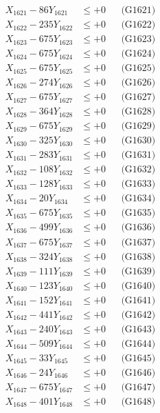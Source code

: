 \documentclass[a4paper,10pt]{article}
\begin{document}
{\begin{align}
\allowbreak
X_{1621} - 86Y_{1621} &\leq +0 && \text{(G1621)} \\
X_{1622} - 235Y_{1622} &\leq +0 && \text{(G1622)} \\
X_{1623} - 675Y_{1623} &\leq +0 && \text{(G1623)} \\
X_{1624} - 675Y_{1624} &\leq +0 && \text{(G1624)} \\
X_{1625} - 675Y_{1625} &\leq +0 && \text{(G1625)} \\
X_{1626} - 274Y_{1626} &\leq +0 && \text{(G1626)} \\
X_{1627} - 675Y_{1627} &\leq +0 && \text{(G1627)} \\
X_{1628} - 364Y_{1628} &\leq +0 && \text{(G1628)} \\
X_{1629} - 675Y_{1629} &\leq +0 && \text{(G1629)} \\
X_{1630} - 325Y_{1630} &\leq +0 && \text{(G1630)} \\
\allowbreak
X_{1631} - 283Y_{1631} &\leq +0 && \text{(G1631)} \\
X_{1632} - 108Y_{1632} &\leq +0 && \text{(G1632)} \\
X_{1633} - 128Y_{1633} &\leq +0 && \text{(G1633)} \\
X_{1634} - 20Y_{1634} &\leq +0 && \text{(G1634)} \\
X_{1635} - 675Y_{1635} &\leq +0 && \text{(G1635)} \\
X_{1636} - 499Y_{1636} &\leq +0 && \text{(G1636)} \\
X_{1637} - 675Y_{1637} &\leq +0 && \text{(G1637)} \\
X_{1638} - 324Y_{1638} &\leq +0 && \text{(G1638)} \\
X_{1639} - 111Y_{1639} &\leq +0 && \text{(G1639)} \\
X_{1640} - 123Y_{1640} &\leq +0 && \text{(G1640)} \\
\allowbreak
X_{1641} - 152Y_{1641} &\leq +0 && \text{(G1641)} \\
X_{1642} - 441Y_{1642} &\leq +0 && \text{(G1642)} \\
X_{1643} - 240Y_{1643} &\leq +0 && \text{(G1643)} \\
X_{1644} - 509Y_{1644} &\leq +0 && \text{(G1644)} \\
X_{1645} - 33Y_{1645} &\leq +0 && \text{(G1645)} \\
X_{1646} - 24Y_{1646} &\leq +0 && \text{(G1646)} \\
X_{1647} - 675Y_{1647} &\leq +0 && \text{(G1647)} \\
X_{1648} - 401Y_{1648} &\leq +0 && \text{(G1648)} \\

\end{align}}
\end{document}
